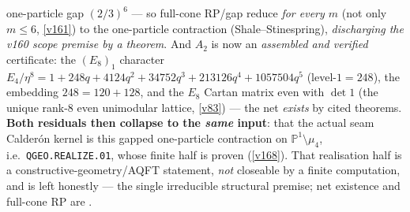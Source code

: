 \documentclass[11pt,a4paper]{article}
\newcommand{\PP}{\mathbb P^1}
\begin{document}
\begin{keybox}
one-particle gap $(2/3)^6$ --- so full-cone RP/gap reduce \emph{for every $m$} (not only $m\le6$, \vref{v161})
to the one-particle contraction (Shale--Stinespring), \emph{discharging the v160 scope premise by a theorem}.
And $A_2$ is now an \emph{assembled and verified} certificate: the $(E_8)_1$ character
$E_4/\eta^8{=}1{+}248q{+}4124q^2{+}34752q^3{+}213126q^4{+}1057504q^5$ (level-$1{=}248$), the embedding
$248{=}120{+}128$, and the $E_8$ Cartan matrix even with $\det 1$ (the unique rank-$8$ even unimodular
lattice, \vref{v83}) --- the net \emph{exists} by cited theorems. \textbf{Both residuals then collapse to the
\emph{same} input}: that the actual seam Calder\'on kernel is this gapped one-particle contraction on
$\PP\setminus\mu_4$, i.e.\ \texttt{QGEO.REALIZE.01}, whose finite half is proven (\vref{v168}). That
realisation half is a constructive-geometry/AQFT statement, \emph{not} closeable by a finite computation, and
is left honestly \mO --- the single irreducible structural premise; net existence and full-cone RP are \mE.
\end{keybox}
\end{document}
